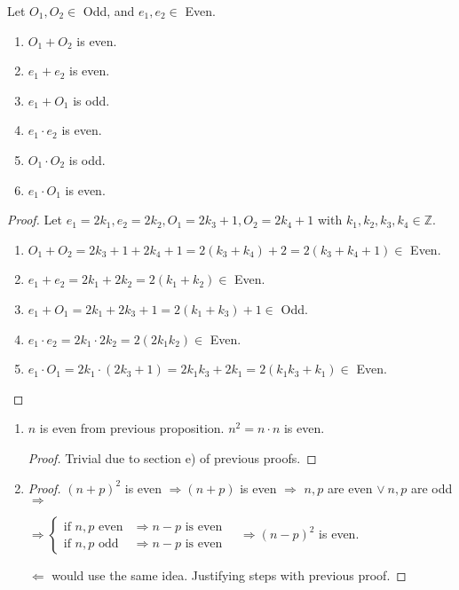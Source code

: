 \documentclass[12pt, a4paper]{book}
\begin{document}
\begin{proposition}
  \boldmath
  Let $O_1,O_2 \in$ Odd, and $e_1,e_2 \in$ Even.
  \begin{enumerate}[label=\emph{\alph*})]
    \item $O_1 + O_2$ is even.
    \item $e_1 + e_2$ is even.
    \item $e_1 + O_1$ is odd.
    \item $e_1 \cdot e_2$ is even.
    \item $O_1 \cdot O_2$ is odd.
    \item $e_1 \cdot O_1$ is even.
  \end{enumerate}
  \unboldmath
\end{proposition}

\begin{proof}
  Let $e_1 = 2 k_1, e_2 = 2 k_2, O_1 = 2 k_3+1, O_2 = 2 k_4+1$ with $k_1, k_2, k_3, k_4 \in\mathbb{Z}$.
  \begin{enumerate}[label=\emph{\alph*})]
    \item $O_1 + O_2 = 2 k_3 +1 +2 k_4 +1 = 2(k_3+k_4) + 2 = 2(k_3+k_4+1) \in$ Even.
    \item $e_1 + e_2 = 2 k_1 + 2 k_2 = 2(k_1+k_2) \in$ Even.
    \item $e_1 + O_1 = 2 k_1 +2 k_3 +1 = 2 (k_1+k_3) +1 \in$ Odd.
    \item $e_1 \cdot e_2 = 2 k_1 \cdot 2 k_2 = 2(2k_1 k_2) \in$ Even.
    \item $e_1 \cdot O_1 = 2 k_1 \cdot (2 k_3 +1) = 2 k_1 k_3 + 2 k_1 = 2 (k_1 k_3 + k_1) \in$ Even.
  \end{enumerate}
\end{proof}

\begin{proposition}
  \begin{enumerate}[label=\emph{\alph*})]
    \item $n$ is even from previous proposition. $n^2 = n \cdot n$ is even.
    \begin{proof}
      Trivial due to section e) of previous proofs.
    \end{proof}
    \item \begin{proof}
      ${(n+p)}^2$ is even $\Rightarrow (n+p)$ is even $\Rightarrow$ $n,p$ are even $\vee\ n,p$ are odd $\Rightarrow$  
    
      $\Rightarrow \displaystyle
      \begin{cases} 
        \text{if } n,p \text{ even} &\Rightarrow n-p \text{ is even} \\
        \text{if } n,p \text{ odd} &\Rightarrow n-p \text{ is even}
      \end{cases}\quad \Rightarrow {(n-p)}^2$ is even.

      $\Leftarrow$ would use the same idea. Justifying steps with previous proof.
    \end{proof}
  \end{enumerate}
\end{proposition}
\end{document}
